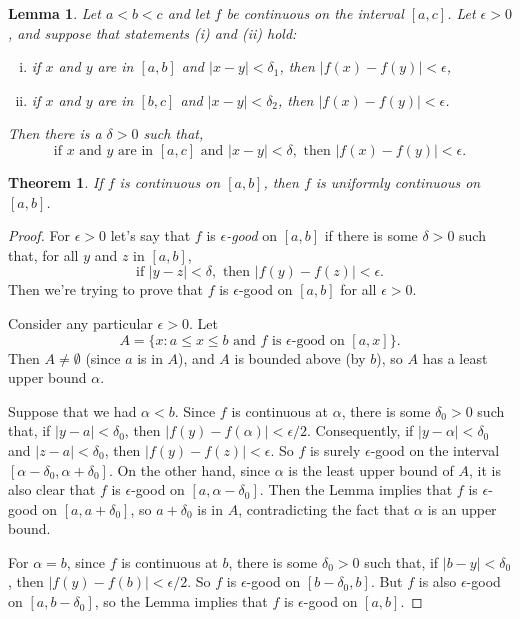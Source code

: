 \documentclass{article}
\numberwithin{definition}{subsection}
\numberwithin{lemma}{subsection}
\newtheorem*{lemma*}{Lemma}
\newtheorem{theorem}{Theorem}
\numberwithin{theorem}{subsection}
\begin{document}
\begin{lemma*}
  Let $a < b < c$ and let $f$ be continuous on the interval $[a, c]$. Let
  $\epsilon > 0$, and suppose that statements (i) and (ii) hold:
  \begin{enumerate}[(i)]
    \item if $x$ and $y$ are in $[a, b]$ and $|x - y| < \delta_1$, then
      $|f(x) - f(y)| < \epsilon$,
    \item if $x$ and $y$ are in $[b, c]$ and $|x - y| < \delta_2$, then
      $|f(x) - f(y)| < \epsilon$.
  \end{enumerate}
  Then there is a $\delta > 0$ such that, \[
    \text{if } x \text{ and } y \text{ are in } [a, c] \text{ and } |x - y| <
    \delta, \text{ then } |f(x) - f(y)| < \epsilon.
  \]
\end{lemma*}

\begin{theorem}
  If $f$ is continuous on $[a, b]$, then $f$ is uniformly continuous on $[a,
  b]$.
\end{theorem}
\begin{proof}
  For $\epsilon > 0$ let's say that $f$ is \emph{$\epsilon$-good} on $[a, b]$
  if there is some $\delta > 0$ such that, for all $y$ and $z$ in $[a, b]$, \[
    \text{if } |y - z| < \delta, \text{ then } |f(y) - f(z)| < \epsilon.
  \] Then we're trying to prove that $f$ is $\epsilon$-good on $[a, b]$ for all
  $\epsilon > 0$.

  Consider any particular $\epsilon > 0$. Let \[
    A = \{x: a \leq x \leq b \text{ and } f \text{ is }
    \epsilon\text{-good on } [a, x]\}.
  \] Then $A \neq \emptyset$ (since $a$ is in $A$), and $A$ is bounded above
  (by $b$), so $A$ has a least upper bound $\alpha$.

  Suppose that we had $\alpha < b$. Since $f$ is continuous at $\alpha$, there
  is some $\delta_0 > 0$ such that, if $|y - a| < \delta_0$, then $|f(y) -
  f(\alpha)| < \epsilon/2$. Consequently, if $|y - \alpha| < \delta_0$ and $|z
  - a| < \delta_0$, then $|f(y) - f(z)| < \epsilon$. So $f$ is surely
  $\epsilon$-good on the interval $[\alpha - \delta_0, \alpha + \delta_0]$. On
  the other hand, since $\alpha$ is the least upper bound of $A$, it is also
  clear that $f$ is $\epsilon$-good on $[a, \alpha - \delta_0]$. Then the Lemma
  implies that $f$ is $\epsilon$-good on $[a, a + \delta_0]$, so $a + \delta_0$
  is in $A$, contradicting the fact that $\alpha$ is an upper bound.

  For $\alpha = b$, since $f$ is continuous at $b$, there is some $\delta_0 >
  0$ such that, if $|b - y| < \delta_0$, then $|f(y) - f(b)| < \epsilon/2$. So
  $f$ is $\epsilon$-good on $[b - \delta_0, b]$. But $f$ is also
  $\epsilon$-good on $[a, b - \delta_0]$, so the Lemma implies that $f$ is
  $\epsilon$-good on $[a, b]$.
\end{proof}
\end{document}
